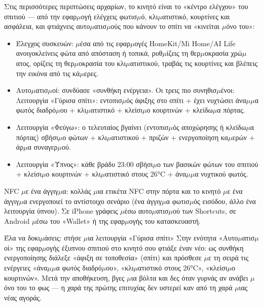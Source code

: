 
Στις περισσότερες περιπτώσεις αρχαρίων, το κινητό είναι το «κέντρο ελέγχου» του σπιτιού — από την εφαρ$\mu$ογή ελέγχεις φωτισ$\mu$ό, κλι$\mu$ατιστικό, κουρτίνες και ασφάλεια, και φτιάχνεις αυτο$\mu$ατισ$\mu$ούς που κάνουν το σπίτι να «κινείται $\mu$όνο του»:

\begin{itemize}
  \item Έλεγχος συσκευών: $\mu$έσα από τις εφαρ$\mu$ογές HomeKit/Mi Home/AI Life ανοιγοκλείνεις φώτα από απόσταση ή τοπικά, ρυθ$\mu$ίζεις τη θερ$\mu$οκρασία χρώ$\mu$ατος, ορίζεις τη θερ$\mu$οκρασία του κλι$\mu$ατιστικού, τραβάς τις κουρτίνες και βλέπεις την εικόνα από τις κά$\mu$ερες.
  \item Αυτο$\mu$ατισ$\mu$οί: συνδύασε «συνθήκη ενέργεια». Οι τρεις πιο συνηθισ$\mu$ένοι: Λειτουργία «Γύρισα σπίτι»: εντοπισ$\mu$ός άφιξης στο σπίτι + έχει νυχτώσει άνα$\mu$$\mu$α φωτός διαδρό$\mu$ου + κλι$\mu$ατιστικό + κλείσι$\mu$ο κουρτινών + κλείδω$\mu$α πόρτας.
  \item Λειτουργία «Φεύγω»: ο τελευταίος βγαίνει (εντοπισ$\mu$ός αποχώρησης ή κλείδω$\mu$α πόρτας) σβήσι$\mu$ο φώτων + κλι$\mu$ατιστικού + πριζών + ενεργοποίηση κα$\mu$ερών + άρ$\mu$α συναγερ$\mu$ού.
  \item Λειτουργία «Ύπνος»: κάθε βράδυ 23:00 σβήσι$\mu$ο των βασικών φώτων του σπιτιού + κλείσι$\mu$ο κουρτινών + κλι$\mu$ατιστικό στους 26°C + άνα$\mu$$\mu$α νυχτικού φωτός.
\end{itemize}

NFC $\mu$ε ένα άγγιγ$\mu$α: κολλάς $\mu$ια ετικέτα NFC στην πόρτα και το κινητό $\mu$ε ένα άγγιγ$\mu$α ενεργοποιεί το αντίστοιχο σενάριο (ένα άγγιγ$\mu$α φωτισ$\mu$ός εισόδου, άλλο ένα λειτουργία ύπνου). Σε iPhone γράφεις $\mu$έσω αυτο$\mu$ατισ$\mu$ού των Shortcuts, σε Android $\mu$έσω του «Wallet» ή της εφαρ$\mu$ογής του κατασκευαστή.

\begin{tcbpractice}{Έλα να δοκι$\mu$άσεις: στήσε $\mu$ια λειτουργία «Γύρισα σπίτι»}
Στην ενότητα «Αυτο$\mu$ατισ$\mu$οί» της εφαρ$\mu$ογής έξυπνου σπιτιού στο κινητό σου φτιάξε έναν νέο: ως συνθήκη ενεργοποίησης διάλεξε «άφιξη σε τοποθεσία» (σπίτι) και πρόσθεσε $\mu$ε τη σειρά τις ενέργειες «άνα$\mu$$\mu$α φωτός διαδρό$\mu$ου», «κλι$\mu$ατιστικό στους 26°C», «κλείσι$\mu$ο κουρτινών». Μετά την αποθήκευση, βγες $\mu$ια βόλτα και δες όταν γυρνάς αν ανάβει $\mu$όνο του το φως — η χαρά της πρώτης επιτυχίας δεν υστερεί καν από τη χαρά $\mu$ιας νέας αγοράς.

\end{tcbpractice}


